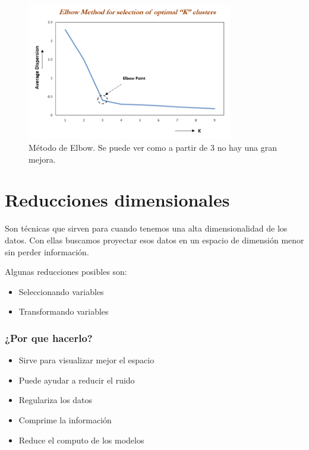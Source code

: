 \documentclass[titlepage,a4paper]{article}
\begin{document}
\begin{figure}[!htb]
    \centering
    \includegraphics[width=0.8\textwidth]{imagenesResumen/ElbowMethod.png}
    \caption{Método de Elbow. Se puede ver como a partir de 3 no hay una gran mejora.}
\end{figure}

\newpage

\section{Reducciones dimensionales}

Son técnicas que sirven para cuando tenemos una alta dimensionalidad de los datos. Con ellas buscamos proyectar esos datos en un espacio de dimensión menor sin perder información. 

Algunas reducciones posibles son:
\begin{itemize}
    \item Seleccionando variables
    \item Transformando variables
\end{itemize}

\subsubsection*{¿Por que hacerlo?}

\begin{itemize}
    \item Sirve para visualizar mejor el espacio
    \item Puede ayudar a reducir el ruido
    \item Regulariza los datos
    \item Comprime la información
    \item Reduce el computo de los modelos
\end{itemize}
\end{document}
